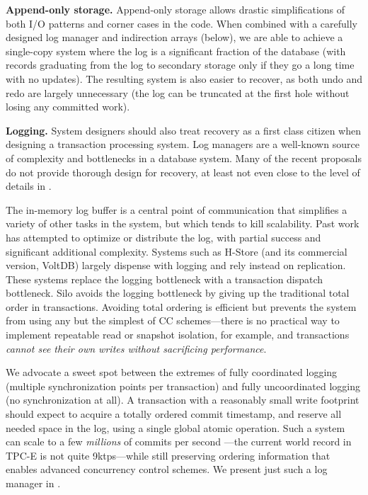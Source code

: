 \vspace{2mm} 
{\bf Append-only storage.}
Append-only storage allows drastic simplifications of both I/O patterns and corner cases in the code. When combined with a carefully designed log manager and indirection arrays (below), we are able to achieve a single-copy system where the log is a significant fraction of the database (with records graduating from the log to secondary storage only if they go a long time with no updates). The resulting system is also easier to recover, as both undo and redo are largely unnecessary (the log can be truncated at the first hole without losing any committed work).

\vspace{2mm} 
{\bf Logging.}
System designers should also treat recovery as a first class citizen when designing a transaction processing system. Log managers are a well-known source of complexity and bottlenecks in a database system. Many of the recent proposals do not provide thorough design for recovery, at least not even close to the level of details in \cite{MohanHLPS92}.

The in-memory log buffer is a central point of communication that simplifies a variety of other tasks in the system, but which tends to kill scalability. Past work has attempted to optimize \cite{JohnsonPSAA10} or distribute \cite{WangJ14} the log, with partial success and significant additional complexity. Systems such as H-Store \cite{Kallman+08} (and its commercial version, VoltDB) largely dispense with logging and rely instead on replication. These systems replace the logging bottleneck with a transaction dispatch bottleneck. Silo avoids the logging bottleneck by giving up the traditional total order in transactions. Avoiding total ordering is efficient but prevents the system from using any but the simplest of CC schemes---there is no practical way to implement repeatable read or snapshot isolation, for example, and transactions {\it cannot see their own writes without sacrificing performance}.

We advocate a sweet spot between the extremes of fully coordinated logging (multiple synchronization points per transaction) and fully uncoordinated logging (no synchronization at all). A transaction with a reasonably small write footprint should expect to acquire a totally ordered commit timestamp, and reserve all needed space in the log, using a single global atomic operation. Such a system can scale to a few {\em millions} of commits per second \cite{TuZKLM13}---the current world record in TPC-E is not quite 9ktps---while still preserving ordering information that enables advanced concurrency control schemes. We present just such a log manager in .


